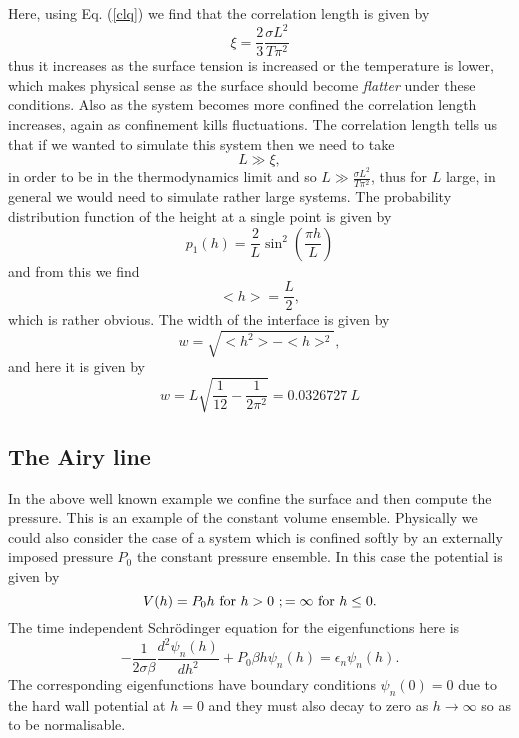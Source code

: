 Here, using Eq. (\ref{clq}) we find that  the correlation length is given by
\begin{equation}
    \xi = \frac{2}{3}\frac{\sigma L^2}{T\pi^2}
    \label{corel}
\end{equation}
thus it increases as the surface tension is increased or the temperature is lower, which makes physical sense as the surface should become {\em flatter} under these conditions. Also as the system becomes more confined the correlation length increases, again as  confinement  
kills fluctuations. The correlation length tells us that if we wanted to simulate this system then we need to take
\begin{equation}
    L\gg \xi ,
\end{equation}
in order to be in the thermodynamics limit and so $L \gg \frac{\sigma L^2}{T\pi^2}$, thus for 
$L$ large, in general we would need to simulate rather large systems.
The probability distribution function of the height at a single point is given by
\begin{equation}
    p_1(h) =\frac{2}{L}\sin^2(\frac{\pi h}{L})
\end{equation}
and from this we find 
\begin{equation}
    < h> = \frac{L}{2},  
\end{equation}
which is rather obvious. The width of the interface is given by 
\begin{equation}
    w=\sqrt{< h^2> - < h>^2},
\end{equation}
and here it is given by
\begin{equation}
    w= L\sqrt{\frac{1}{12}-\frac{1}{2\pi^2}}= 0.0326727\  L
\end{equation}


    \subsection{The Airy line}
In the  above well known example we confine the surface and then compute the pressure. This is an example of the constant volume ensemble. Physically we could also consider the case of a system which is confined softly by an externally imposed pressure $P_0$ the constant pressure ensemble. In this case the potential is given by
\begin{equation}
    V(h) = P_0 h \ {\rm for }\ h>0\ ; =\infty \ {\rm for}\ h\leq 0. 
\end{equation}
The time independent Schr\"odinger equation for the eigenfunctions here is
\begin{equation}
    -\frac{1}{2\sigma\beta}\frac{d^2 \psi_n(h)}{dh^2} + P_0\beta h \psi_n(h) = \epsilon_n\psi_n(h).
\end{equation}
The corresponding eigenfunctions have boundary conditions $\psi_n(0)=0$ due to the hard wall potential at $h=0$ and they must also decay to zero as $h\to \infty$ so as to be normalisable.

